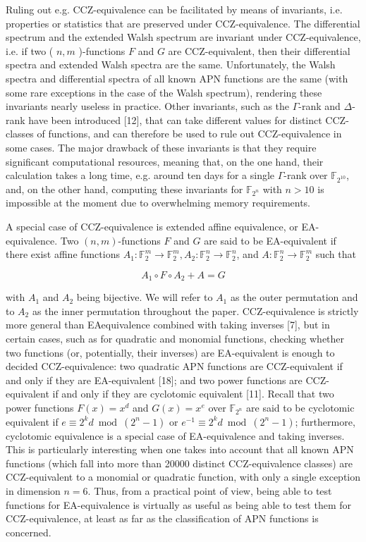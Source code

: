 \documentclass[10pt]{article}
\begin{document}
Ruling out e.g. CCZ-equivalence can be facilitated by means of invariants, i.e. properties or statistics that are preserved under CCZ-equivalence. The differential spectrum and the extended Walsh spectrum are invariant under CCZ-equivalence, i.e. if two ( $n, m$ )-functions $F$ and $G$ are CCZ-equivalent, then their differential spectra and extended Walsh spectra are the same. Unfortunately, the Walsh spectra and differential spectra of all known APN functions are the same (with some rare exceptions in the case of the Walsh spectrum), rendering these invariants nearly useless in practice. Other invariants, such as the $\Gamma$-rank and $\Delta$-rank have been introduced [12], that can take different values for distinct CCZ-classes of functions, and can therefore be used to rule out CCZ-equivalence in some cases. The major drawback of these invariants is that they require significant computational resources, meaning that, on the one hand, their calculation takes a long time, e.g. around ten days for a single $\Gamma$-rank over $\mathbb{F}_{2^{10}}$, and, on the other hand, computing these invariants for $\mathbb{F}_{2^{n}}$ with $n>10$ is impossible at the moment due to overwhelming memory requirements.

A special case of CCZ-equivalence is extended affine equivalence, or EA-equivalence. Two $(n, m)$-functions $F$ and $G$ are said to be EA-equivalent if there exist affine functions $A_{1}: \mathbb{F}_{2}^{m} \rightarrow \mathbb{F}_{2}^{m}, A_{2}: \mathbb{F}_{2}^{n} \rightarrow \mathbb{F}_{2}^{n}$, and $A: \mathbb{F}_{2}^{n} \rightarrow \mathbb{F}_{2}^{m}$ such that


\begin{equation*}
A_{1} \circ F \circ A_{2}+A=G \tag{1}
\end{equation*}


with $A_{1}$ and $A_{2}$ being bijective. We will refer to $A_{1}$ as the outer permutation and to $A_{2}$ as the inner permutation throughout the paper. CCZ-equivalence is strictly more general than EAequivalence combined with taking inverses [7], but in certain cases, such as for quadratic and monomial functions, checking whether two functions (or, potentially, their inverses) are EA-equivalent is enough to decided CCZ-equivalence: two quadratic APN functions are CCZ-equivalent if and only if they are EA-equivalent [18]; and two power functions are CCZ-equivalent if and only if they are cyclotomic equivalent [11]. Recall that two power functions $F(x)=x^{d}$ and $G(x)=x^{e}$ over $\mathbb{F}_{2^{n}}$ are said to be cyclotomic equivalent if $e \equiv 2^{k} d \bmod \left(2^{n}-1\right)$ or $e^{-1} \equiv 2^{k} d \bmod \left(2^{n}-1\right)$; furthermore, cyclotomic equivalence is a special case of EA-equivalence and taking inverses. This is particularly interesting when one takes into account that all known APN functions (which fall into more than 20000 distinct CCZ-equivalence classes) are CCZ-equivalent to a monomial or quadratic function, with only a single exception in dimension $n=6$. Thus, from a practical point of view, being able to test functions for EA-equivalence is virtually as useful as being able to test them for CCZ-equivalence, at least as far as the classification of APN functions is concerned.
\end{document}
